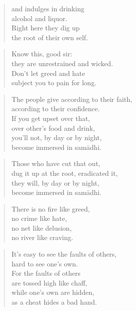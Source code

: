 \documentclass[12pt,openany]{book}%
\begin{document}
\begin{verse}%
and indulges in drinking \\
alcohol and liquor. \\
Right here they dig up \\
the root of their own self. 

%
\end{verse}

\begin{verse}%
Know this, good sir: \\
they are unrestrained and wicked. \\
Don’t let greed and hate \\
subject you to pain for long. 

%
\end{verse}

\begin{verse}%
The people give according to their faith, \\
according to their confidence. \\
If you get upset over that, \\
over other’s food and drink, \\
you’ll not, by day or by night, \\
become immersed in \textsanskrit{samādhi}. 

%
\end{verse}

\begin{verse}%
Those who have cut that out, \\
dug it up at the root, eradicated it, \\
they will, by day or by night, \\
become immersed in \textsanskrit{samādhi}. 

%
\end{verse}

\begin{verse}%
There is no fire like greed, \\
no crime like hate, \\
no net like delusion, \\
no river like craving. 

%
\end{verse}

\begin{verse}%
It’s easy to see the faults of others, \\
hard to see one’s own. \\
For the faults of others \\
are tossed high like chaff, \\
while one’s own are hidden, \\
as a cheat hides a bad hand. 

%
\end{verse}
\end{document}
